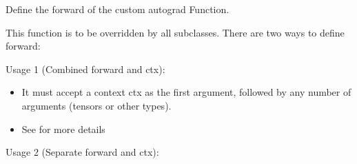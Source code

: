 \documentclass[letterpaper,10pt,english]{sphinxmanual}
\begin{document}
\begin{fulllineitems}
\begin{fulllineitems}
\end{fulllineitems}


\begin{fulllineitems}
\label{\detokenize{api:hypyml.models.Physics.forward}}
\pysigstartsignatures
{}
\pysigstopsignatures
\sphinxAtStartPar
Define the forward of the custom autograd Function.

\sphinxAtStartPar
This function is to be overridden by all subclasses.
There are two ways to define forward:

\sphinxAtStartPar
Usage 1 (Combined forward and ctx):

\begin{sphinxVerbatim}[commandchars=\\\{\}]
        
\end{sphinxVerbatim}
\begin{itemize}
\item {} 
\sphinxAtStartPar
It must accept a context ctx as the first argument, followed by any
number of arguments (tensors or other types).

\item {} 
\sphinxAtStartPar
See  for more details

\end{itemize}

\sphinxAtStartPar
Usage 2 (Separate forward and ctx):

\begin{sphinxVerbatim}[commandchars=\\\{\}]
      


\end{sphinxVerbatim}
\end{fulllineitems}
\end{fulllineitems}
\end{document}
